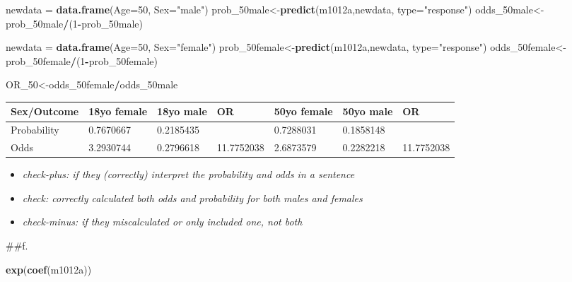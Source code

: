 \documentclass[]{article}
\newenvironment{Shaded}{\begin{snugshade}}{\end{snugshade}}
\newcommand{\DataTypeTok}[1]{\textcolor[rgb]{0.13,0.29,0.53}{#1}}
\newcommand{\DecValTok}[1]{\textcolor[rgb]{0.00,0.00,0.81}{#1}}
\newcommand{\KeywordTok}[1]{\textcolor[rgb]{0.13,0.29,0.53}{\textbf{#1}}}
\newcommand{\NormalTok}[1]{#1}
\newcommand{\OperatorTok}[1]{\textcolor[rgb]{0.81,0.36,0.00}{\textbf{#1}}}
\newcommand{\StringTok}[1]{\textcolor[rgb]{0.31,0.60,0.02}{#1}}
\providecommand{\tightlist}{%
  \setlength{\itemsep}{0pt}\setlength{\parskip}{0pt}}
\begin{document}
\begin{Shaded}
\begin{Highlighting}[]
\NormalTok{newdata =}\StringTok{ }\KeywordTok{data.frame}\NormalTok{(}\DataTypeTok{Age=}\DecValTok{50}\NormalTok{, }\DataTypeTok{Sex=}\StringTok{"male"}\NormalTok{)}
\NormalTok{prob_50male<-}\KeywordTok{predict}\NormalTok{(m1012a,newdata, }\DataTypeTok{type=}\StringTok{"response"}\NormalTok{)}
\NormalTok{odds_50male<-prob_50male}\OperatorTok{/}\NormalTok{(}\DecValTok{1}\OperatorTok{-}\NormalTok{prob_50male)}

\NormalTok{newdata =}\StringTok{ }\KeywordTok{data.frame}\NormalTok{(}\DataTypeTok{Age=}\DecValTok{50}\NormalTok{, }\DataTypeTok{Sex=}\StringTok{"female"}\NormalTok{)}
\NormalTok{prob_50female<-}\KeywordTok{predict}\NormalTok{(m1012a,newdata, }\DataTypeTok{type=}\StringTok{"response"}\NormalTok{)}
\NormalTok{odds_50female<-prob_50female}\OperatorTok{/}\NormalTok{(}\DecValTok{1}\OperatorTok{-}\NormalTok{prob_50female)}

\NormalTok{OR_}\DecValTok{50}\NormalTok{<-odds_50female}\OperatorTok{/}\NormalTok{odds_50male}
\end{Highlighting}
\end{Shaded}

\begin{longtable}[]{@{}lllllll@{}}
\toprule
Sex/Outcome & 18yo female & 18yo male & OR & 50yo female & 50yo male &
OR\tabularnewline
\midrule
\endhead
Probability & 0.7670667 & 0.2185435 & & 0.7288031 & 0.1858148
&\tabularnewline
Odds & 3.2930744 & 0.2796618 & 11.7752038 & 2.6873579 & 0.2282218 &
11.7752038\tabularnewline
\bottomrule
\end{longtable}

\begin{itemize}
\tightlist
\item
  \emph{check-plus: if they (correctly) interpret the probability and
  odds in a sentence}
\item
  \emph{check: correctly calculated both odds and probability for both
  males and females}
\item
  \emph{check-minus: if they miscalculated \emph{or} only included one,
  not both}
\end{itemize}

\#\#f.

\begin{Shaded}
\begin{Highlighting}[]
\KeywordTok{exp}\NormalTok{(}\KeywordTok{coef}\NormalTok{(m1012a))}
\end{Highlighting}
\end{Shaded}
\end{document}
